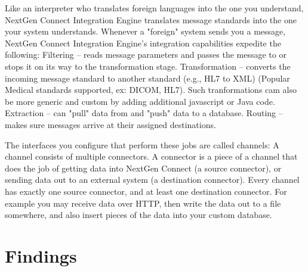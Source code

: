 Like an interpreter who translates foreign languages into the one you understand, NextGen Connect Integration Engine translates message standards into the one your system understands.
Whenever a "foreign" system sends you a message, NextGen Connect Integration Engine’s integration capabilities expedite the following:
Filtering – reads message parameters and passes the message to or stops it on its way to the transformation stage.
Transformation – converts the incoming message standard to another standard (e.g., HL7 to XML) (Popular Medical standards supported, ex: DICOM, HL7). Such tranformations cam also be more generic and custom by adding additional javascript or Java code.
Extraction – can "pull" data from and "push" data to a database.
Routing – makes sure messages arrive at their assigned destinations.

The interfaces you configure that perform these jobs are called channels:
A channel consists of multiple connectors.
A connector is a piece of a channel that does the job of getting data into NextGen Connect (a source connector), or sending data out to an external system (a destination connector).
Every channel has exactly one source connector, and at least one destination connector.
For example you may receive data over HTTP, then write the data out to a file somewhere, and also insert pieces of the data into your custom database.



\section{Findings}

